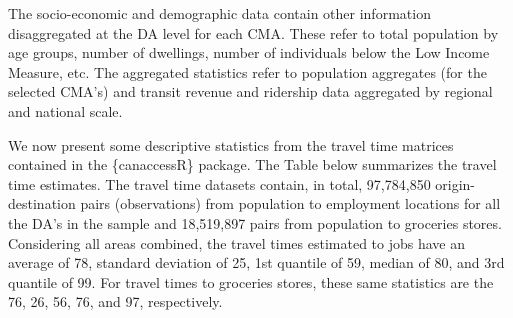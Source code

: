 \documentclass[Royal,times,sageh]{sagej}
\begin{document}
The socio-economic and demographic data contain other information
disaggregated at the DA level for each CMA. These refer to total
population by age groups, number of dwellings, number of individuals
below the Low Income Measure, etc. The aggregated statistics refer to
population aggregates (for the selected CMA's) and transit revenue and
ridership data aggregated by regional and national scale.

We now present some descriptive statistics from the travel time matrices
contained in the \{canaccessR\} package. The Table \citet{tbl-table_1}
below summarizes the travel time estimates. The travel time datasets
contain, in total, 97,784,850 origin-destination pairs (observations)
from population to employment locations for all the DA's in the sample
and 18,519,897 pairs from population to groceries stores. Considering
all areas combined, the travel times estimated to jobs have an average
of 78, standard deviation of 25, 1st quantile of 59, median of 80, and
3rd quantile of 99. For travel times to groceries stores, these same
statistics are the 76, 26, 56, 76, and 97, respectively.
\end{document}

